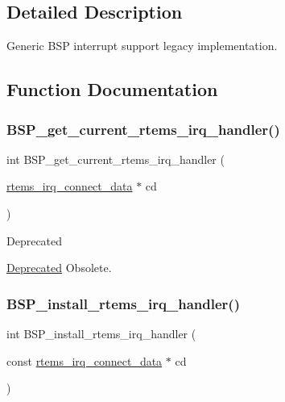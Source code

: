 \subsection{Detailed Description}
Generic B\+SP interrupt support legacy implementation. 



\subsection{Function Documentation}
\mbox{\label{irq-legacy_8c_a58a7375c32f3af8b27a7c6f8affa68dd}} 
\subsubsection{\texorpdfstring{BSP\_get\_current\_rtems\_irq\_handler()}{BSP\_get\_current\_rtems\_irq\_handler()}}
{\footnotesize\ttfamily int B\+S\+P\+\_\+get\+\_\+current\+\_\+rtems\+\_\+irq\+\_\+handler (\begin{DoxyParamCaption}\item[{\mbox{\hyperlink{struct____rtems__irq__connect__data____}{rtems\+\_\+irq\+\_\+connect\+\_\+data}} $\ast$}]{cd }\end{DoxyParamCaption})}

\begin{DoxyRefDesc}{Deprecated}
\item[\mbox{\hyperlink{deprecated__deprecated000001}{Deprecated}}]Obsolete. \end{DoxyRefDesc}
\mbox{\label{irq-legacy_8c_aafe4bbaa5e7fb14cfe9da0a0eeab677f}} 
\subsubsection{\texorpdfstring{BSP\_install\_rtems\_irq\_handler()}{BSP\_install\_rtems\_irq\_handler()}}
{\footnotesize\ttfamily int B\+S\+P\+\_\+install\+\_\+rtems\+\_\+irq\+\_\+handler (\begin{DoxyParamCaption}\item[{const \mbox{\hyperlink{struct____rtems__irq__connect__data____}{rtems\+\_\+irq\+\_\+connect\+\_\+data}} $\ast$}]{cd }\end{DoxyParamCaption})}


